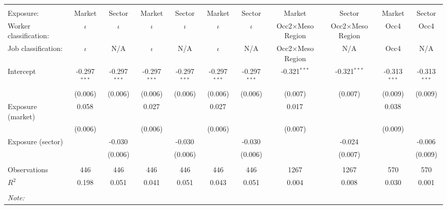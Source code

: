 \begin{tabular}{@{\extracolsep{5pt}}lcccccccccc}
\\[-1.8ex]\hline
\hline \\[-1.8ex]
\hline \\[-1.8ex]
 Exposure: & Market & Sector & Market & Sector & Market & Sector & Market & Sector & Market & Sector \\
 Worker classification: & $\iota$ & $\iota$ & $\iota$ & $\iota$ & $\iota$ & $\iota$ & Occ2$\times$Meso Region & Occ2$\times$Meso Region & Occ4 & Occ4 \\
 Job classification: & $\iota$ & N/A & $\iota$ & N/A & $\iota$ & N/A & Occ2$\times$Meso Region & N/A & Occ4 & N/A \\
 Intercept & -0.297$^{***}$ & -0.297$^{***}$ & -0.297$^{***}$ & -0.297$^{***}$ & -0.297$^{***}$ & -0.297$^{***}$ & -0.321$^{***}$ & -0.321$^{***}$ & -0.313$^{***}$ & -0.313$^{***}$ \\
& (0.006) & (0.006) & (0.006) & (0.006) & (0.006) & (0.006) & (0.007) & (0.007) & (0.009) & (0.009) \\
 Exposure (market) & 0.058$^{}$ & & 0.027$^{}$ & & 0.027$^{}$ & & 0.017$^{}$ & & 0.038$^{}$ & \\
& (0.006) & & (0.006) & & (0.006) & & (0.007) & & (0.009) & \\
 Exposure (sector) & & -0.030$^{}$ & & -0.030$^{}$ & & -0.030$^{}$ & & -0.024$^{}$ & & -0.006$^{}$ \\
& & (0.006) & & (0.006) & & (0.006) & & (0.007) & & (0.009) \\
\hline \\[-1.8ex]
 Observations & 446 & 446 & 446 & 446 & 446 & 446 & 1267 & 1267 & 570 & 570 \\
 $R^2$ & 0.198 & 0.051 & 0.041 & 0.051 & 0.043 & 0.051 & 0.004 & 0.008 & 0.030 & 0.001 \\
\hline
\hline \\[-1.8ex]
\textit{Note:}\end{tabular}